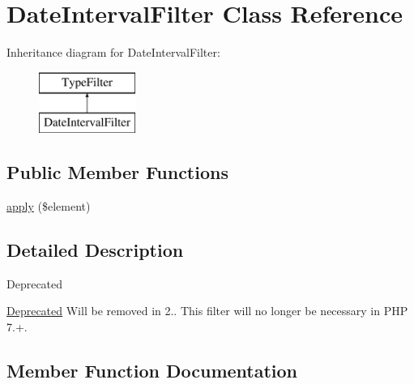 \hypertarget{class_deep_copy_1_1_type_filter_1_1_date_1_1_date_interval_filter}{}\section{Date\+Interval\+Filter Class Reference}
\label{class_deep_copy_1_1_type_filter_1_1_date_1_1_date_interval_filter}
Inheritance diagram for Date\+Interval\+Filter\+:\begin{figure}[H]
\begin{center}
\leavevmode
\includegraphics[height=2.000000cm]{class_deep_copy_1_1_type_filter_1_1_date_1_1_date_interval_filter}
\end{center}
\end{figure}
\subsection*{Public Member Functions}
\begin{DoxyCompactItemize}
\item 
\mbox{\hyperlink{class_deep_copy_1_1_type_filter_1_1_date_1_1_date_interval_filter_a959e75f8f2b305dcf33633745c338176}{apply}} (\$element)
\end{DoxyCompactItemize}


\subsection{Detailed Description}
\begin{DoxyRefDesc}{Deprecated}
\item[\mbox{\hyperlink{deprecated__deprecated000021}{Deprecated}}]Will be removed in 2.. This filter will no longer be necessary in P\+HP 7.+. \end{DoxyRefDesc}


\subsection{Member Function Documentation}
\mbox{\label{class_deep_copy_1_1_type_filter_1_1_date_1_1_date_interval_filter_a959e75f8f2b305dcf33633745c338176}} 

